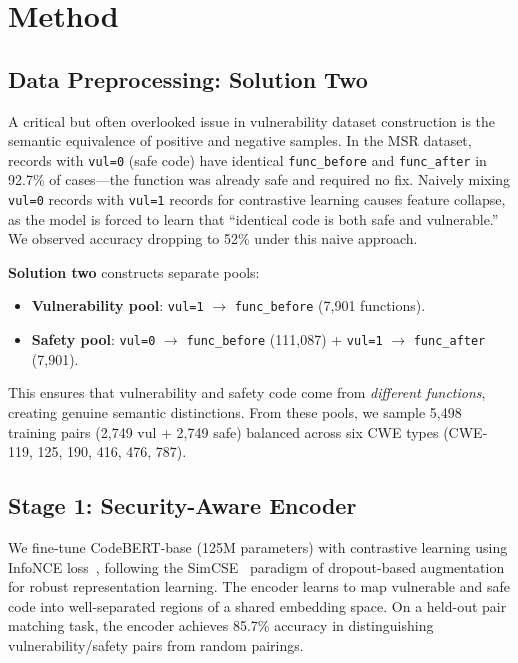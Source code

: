 \documentclass[sigconf,10pt]{acmart}
\begin{document}
\section{Method}

\subsection{Data Preprocessing: Solution Two}

A critical but often overlooked issue in vulnerability dataset construction is the semantic equivalence of positive and negative samples. In the MSR dataset, records with \texttt{vul=0} (safe code) have identical \texttt{func\_before} and \texttt{func\_after} in 92.7\% of cases---the function was already safe and required no fix. Naively mixing \texttt{vul=0} records with \texttt{vul=1} records for contrastive learning causes feature collapse, as the model is forced to learn that ``identical code is both safe and vulnerable.'' We observed accuracy dropping to 52\% under this naive approach.

\textbf{Solution two} constructs separate pools:
\begin{itemize}
\item \textbf{Vulnerability pool}: \texttt{vul=1} $\rightarrow$ \texttt{func\_before} (7,901 functions).
\item \textbf{Safety pool}: \texttt{vul=0} $\rightarrow$ \texttt{func\_before} (111,087) + \texttt{vul=1} $\rightarrow$ \texttt{func\_after} (7,901).
\end{itemize}
This ensures that vulnerability and safety code come from \textit{different functions}, creating genuine semantic distinctions. From these pools, we sample 5,498 training pairs (2,749 vul + 2,749 safe) balanced across six CWE types (CWE-119, 125, 190, 416, 476, 787).

\subsection{Stage 1: Security-Aware Encoder}

We fine-tune CodeBERT-base (125M parameters) with contrastive learning using InfoNCE loss~\cite{infonce}, following the SimCSE~\cite{simcse} paradigm of dropout-based augmentation for robust representation learning. The encoder learns to map vulnerable and safe code into well-separated regions of a shared embedding space. On a held-out pair matching task, the encoder achieves 85.7\% accuracy in distinguishing vulnerability/safety pairs from random pairings.
\end{document}
